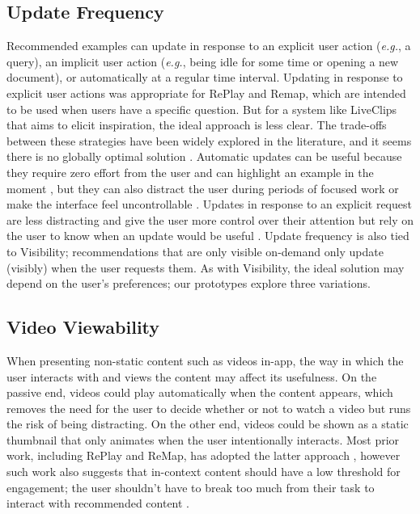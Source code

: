 \subsection{Update Frequency}
Recommended examples can update in response to an explicit user action (\textit{e.g.}, a query), an implicit user action (\textit{e.g.}, being idle for some time or opening a new document), or automatically at a regular time interval. Updating in response to explicit user actions was appropriate for RePlay and Remap, which are intended to be used when users have a specific question. But for a system like LiveClips that aims to elicit inspiration, the ideal approach is less clear. The trade-offs between these strategies have been widely explored in the literature, and it seems there is no globally optimal solution \cite{Rhodes1996, Chan2017, Siangliulue2015}. Automatic updates can be useful because they require zero effort from the user and can highlight an example in the moment \cite{Rhodes1996}, but they can also distract the user during periods of focused work \cite{Chan2017} or make the interface feel uncontrollable \cite{ODonovan2015}. Updates in response to an explicit request are less distracting and give the user more control over their attention but rely on the user to know when an update would be useful \cite{Rhodes1996, Siangliulue2015}. Update frequency is also tied to Visibility; recommendations that are only visible on-demand only update (visibly) when the user requests them. As with Visibility, the ideal solution may depend on the user's preferences; our prototypes explore three variations.

\subsection{Video Viewability}
When presenting non-static content such as videos in-app, the way in which the user interacts with and views the content may affect its usefulness. On the passive end, videos could play automatically when the content appears, which removes the need for the user to decide whether or not to watch a video but runs the risk of being distracting. On the other end, videos could be shown as a static thumbnail that only animates when the user intentionally interacts. Most prior work, including RePlay and ReMap, has adopted the latter approach \cite{Grossman2010a, Chi2012}, however such work also suggests that in-context content should have a low threshold for engagement; the user shouldn't have to break too much from their task to interact with recommended content \cite{Grossman2010a}.

